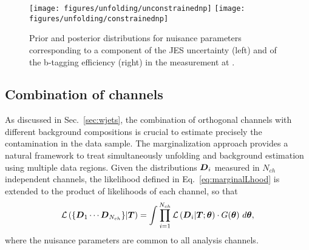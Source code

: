 \begin{figure}[!htb]\centering
  \texttt{[image: figures/unfolding/unconstrainednp]}
  \texttt{[image: figures/unfolding/constrainednp]}
  \caption{Prior and posterior distributions for nuisance parameters
    corresponding to a component of the JES uncertainty (left) and of
    the b-tagging efficiency (right) in the measurement at \eighttev{}.}
  \label{fig:nuispar}
\end{figure}

\subsection{Combination of channels}

As discussed in Sec.~\ref{sec:wjets}, the combination of
orthogonal channels with different background compositions is crucial
to estimate precisely the \wjets{} contamination in the \eighttev{}
data sample.
The marginalization approach provides a natural framework to treat
simultaneously unfolding and background estimation using
multiple data regions. Given the distributions $\boldsymbol{D}{}_i$ measured in $N_{ch}$
independent channels, the likelihood defined in Eq.~\ref{eq:marginalLhood}
is extended to the product of likelihoods of each channel, so that
\begin{equation}
  \mathcal{L}\left(\{\boldsymbol{D}{}_1\cdots{}\boldsymbol{D}{}_{N_{ch}}\}|\boldsymbol{T}{}\right)=
  \int
  \prod_{i=1}^{N_{ch}}\mathcal{L}\left(\boldsymbol{D}{}_i|\boldsymbol{T}{};\boldsymbol{\theta}{}\right) 
  \cdot{} G(\boldsymbol{\theta}{})
  ~d\boldsymbol{\theta}{},
\end{equation}
where the nuisance parameters are common to all analysis channels.

